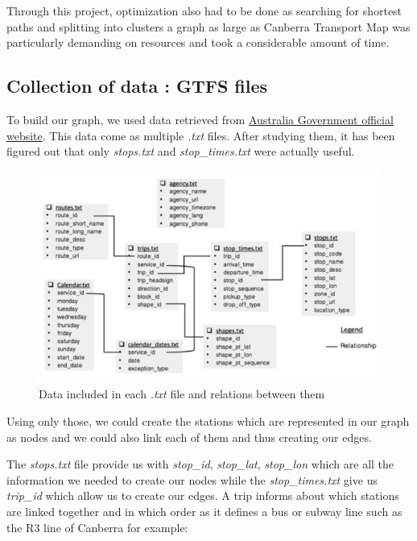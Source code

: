 \documentclass{article}
\begin{document}
	Through this project, optimization also had to be done as searching for shortest paths and splitting into clusters a graph as large as Canberra Transport Map was particularly demanding on resources and took a considerable amount of time.
	
\subsection{Collection of data : GTFS files}
	
	To build our graph, we used data retrieved from \href{https://www.transport.act.gov.au/contact-us/information-for-developers}{Australia Government official website}. This data come as multiple \textit{.txt} files. After studying them, it has been figured out that only \textit{stops.txt} and \textit{stop\_times.txt} were actually useful.
	
\begin{figure}[h]
\begin{center}
	\includegraphics[scale=0.8]{assets/data}
\end{center} 
\caption{Data included in each \textit{.txt} file and relations between them}
\end{figure} 


	Using only those, we could create the stations which are represented in our graph as nodes and we could also link each of them and thus creating our edges.
	
\newpage
	
	The \textit{stops.txt} file provide us with \textit{stop\_id},  \textit{stop\_lat}, \textit{stop\_lon} which are all the information we needed to create our nodes while the \textit{stop\_times.txt} give us \textit{trip\_id} which allow us to create our edges. A trip informs about which stations are linked together and in which order as it defines a bus or subway line such as the R3 line of Canberra for example:
	
\end{document}
